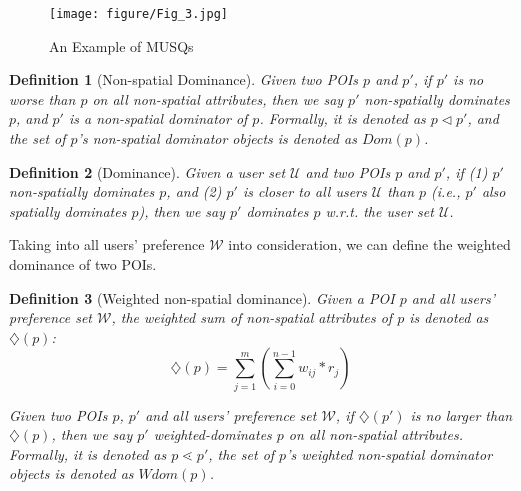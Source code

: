 \documentclass[10pt, conference, compsocconf]{IEEEtran}
\newtheorem{myDef}{Definition}
\begin{document}

\begin{figure}[htbp]
	\centering
	\texttt{[image: figure/Fig\_3.jpg]}
	\caption{An Example of MUSQs}\label{query}
\end{figure}

\begin{myDef}[Non-spatial Dominance]\label{Definition1}
    Given two POIs $p$ and $p'$, if $p'$ is no worse than $p$ on all non-spatial attributes, then we say $p'$ non-spatially dominates $p$, and $p'$ is a non-spatial dominator of $p$. Formally, it is denoted as $p \lhd p'$, and the set of $p$'s non-spatial dominator objects is denoted as $Dom(p)$.
\end{myDef}

\begin{myDef}[Dominance]\label{Definition2}
    Given a user set $\mathcal{U}$ and two POIs $p$ and $p'$, if (1) $p'$ non-spatially dominates $p$, and (2) $p'$ is closer to all users $\mathcal{U}$ than $p$ (i.e., $p'$ also spatially dominates $p$), then we say $p'$ dominates $p$ w.r.t. the user set $\mathcal{U}$.
\end{myDef}

Taking into all users' preference $\mathcal{W}$ into consideration, we can define the weighted dominance of two POIs.

\begin{myDef}[Weighted non-spatial dominance]\label{Definition3}
    Given a POI $p$ and all users' preference set $\mathcal{W}$, the weighted sum of non-spatial attributes of $p$ is denoted as $\diamondsuit(p)$:
    \begin{equation*}
        \diamondsuit(p) = \sum_{j=1}^{m}(\sum_{i=0}^{n-1}w_{ij} * r_j)
    \end{equation*}

    Given two POIs $p$, $p'$ and  all users' preference set $\mathcal{W}$, if $\diamondsuit(p')$ is no larger than $\diamondsuit(p)$, then we say $p'$ weighted-dominates $p$ on all non-spatial attributes. Formally, it is denoted as $p\lessdot p'$, the set of $p$'s weighted non-spatial dominator objects is denoted as $Wdom(p)$.
\end{myDef}
\end{document}
